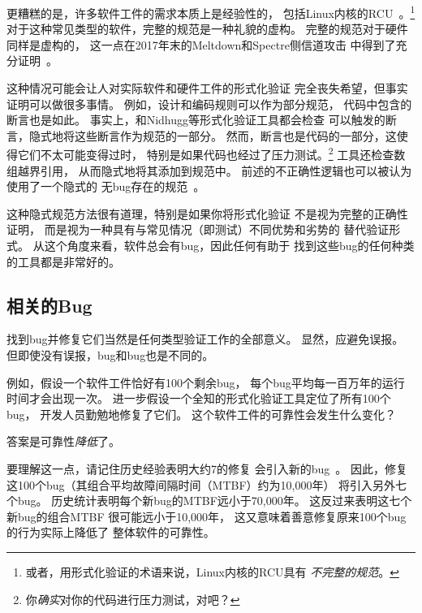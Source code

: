 更糟糕的是，许多软件工件的需求本质上是经验性的，
包括Linux内核的RCU~\cite{PaulEMcKenney2015RCUreqts1,PaulEMcKenney2015RCUreqts2,PaulEMcKenney2015RCUreqts3}。\footnote{
	或者，用形式化验证的术语来说，Linux内核的RCU具有
	\emph{不完整的规范}。}
对于这种常见类型的软件，完整的规范是一种礼貌的虚构。
完整的规范对于硬件同样是虚构的，
这一点在2017年末的Meltdown和Spectre侧信道攻击
中得到了充分证明~\cite{JannHorn2018MeltdownSpectre}。

这种情况可能会让人对实际软件和硬件工件的形式化验证
完全丧失希望，但事实证明可以做很多事情。
例如，设计和编码规则可以作为部分规范，
代码中包含的断言也是如此。
事实上，和Nidhugg等形式化验证工具都会检查
可以触发的断言，隐式地将这些断言作为规范的一部分。
然而，断言也是代码的一部分，这使得它们不太可能变得过时，
特别是如果代码也经过了压力测试。\footnote{
	你\emph{确实}对你的代码进行压力测试，对吧？}
工具还检查数组越界引用，
从而隐式地将其添加到规范中。
前述的不正确性逻辑也可以被认为使用了一个隐式的
无bug存在的规范~\cite{PeterWOHearn2019incorrectnessLogic}。

这种隐式规范方法很有道理，特别是如果你将形式化验证
不是视为完整的正确性证明，
而是视为一种具有与常见情况（即测试）不同优势和劣势的
替代验证形式。
从这个角度来看，软件总会有bug，因此任何有助于
找到这些bug的任何种类的工具都是非常好的。

\subsection{相关的Bug}
\label{sec:future:Relevant Bugs}

找到bug并修复它们当然是任何类型验证工作的全部意义。
显然，应避免误报。
但即使没有误报，bug和bug也是不同的。

例如，假设一个软件工件恰好有100个剩余bug，
每个bug平均每一百万年的运行时间才会出现一次。
进一步假设一个全知的形式化验证工具定位了所有100个bug，
开发人员勤勉地修复了它们。
这个软件工件的可靠性会发生什么变化？

答案是可靠性\emph{降低}了。

要理解这一点，请记住历史经验表明大约7\pct{}的修复
会引入新的bug~\cite{RexBlack2012SQA}。
因此，修复这100个bug（其组合平均故障间隔时间（MTBF）约为10,000年）
将引入另外七个bug。
历史统计表明每个新bug的MTBF远小于70,000年。
这反过来表明这七个新bug的组合MTBF
很可能远小于10,000年，
这又意味着善意修复原来100个bug的行为实际上降低了
整体软件的可靠性。

